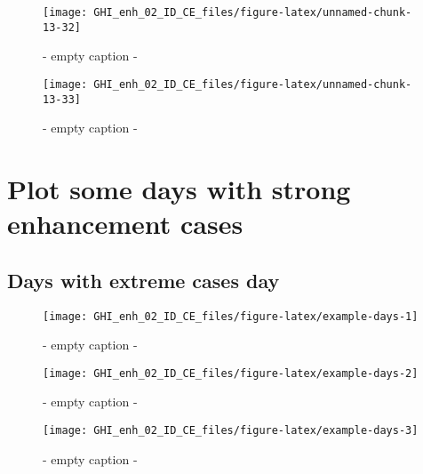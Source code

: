 \documentclass[
  10pt,
  a4paper,oneside]{article}
\begin{document}
\begin{figure}[H]

{\centering \texttt{[image: GHI\_enh\_02\_ID\_CE\_files/figure-latex/unnamed-chunk-13-32]} 

}

\caption{ - empty caption - }\label{fig:unnamed-chunk-13-32}
\end{figure}
\begin{figure}[H]

{\centering \texttt{[image: GHI\_enh\_02\_ID\_CE\_files/figure-latex/unnamed-chunk-13-33]} 

}

\caption{ - empty caption - }\label{fig:unnamed-chunk-13-33}
\end{figure}

\FloatBarrier

\hypertarget{plot-some-days-with-strong-enhancement-cases}{%
\section{Plot some days with strong enhancement cases}\label{plot-some-days-with-strong-enhancement-cases}}

\FloatBarrier

\hypertarget{days-with-extreme-cases-day}{%
\subsection{Days with extreme cases day}\label{days-with-extreme-cases-day}}

\begin{figure}[H]

{\centering \texttt{[image: GHI\_enh\_02\_ID\_CE\_files/figure-latex/example-days-1]} 

}

\caption{ - empty caption - }\label{fig:example-days-1}
\end{figure}

\begin{figure}[H]

{\centering \texttt{[image: GHI\_enh\_02\_ID\_CE\_files/figure-latex/example-days-2]} 

}

\caption{ - empty caption - }\label{fig:example-days-2}
\end{figure}

\begin{figure}[H]

{\centering \texttt{[image: GHI\_enh\_02\_ID\_CE\_files/figure-latex/example-days-3]} 

}

\caption{ - empty caption - }\label{fig:example-days-3}
\end{figure}
\end{document}
